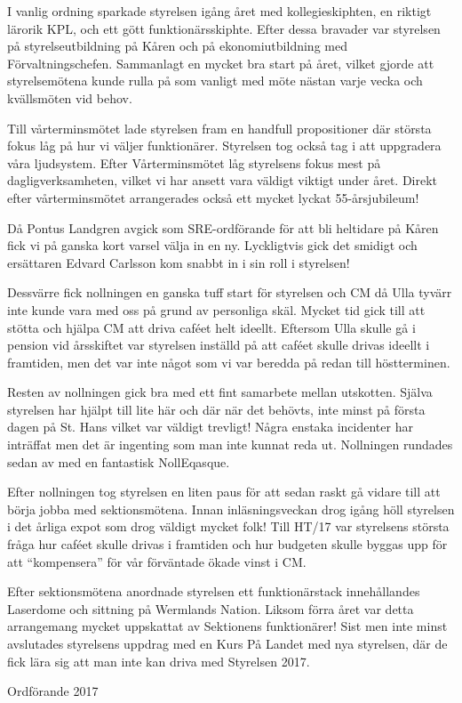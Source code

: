 \documentclass[../_main/handlingar.tex]{subfiles}
\begin{document}
I vanlig ordning sparkade styrelsen igång året med kollegieskiphten, en riktigt lärorik KPL, och ett gött funktionärsskiphte. Efter dessa bravader var styrelsen på styrelseutbildning på Kåren och på ekonomiutbildning med Förvaltningschefen. Sammanlagt en mycket bra start på året, vilket gjorde att styrelsemötena kunde rulla på som vanligt med möte nästan varje vecka och kvällsmöten vid behov.

Till vårterminsmötet lade styrelsen fram en handfull propositioner där största fokus låg på hur vi väljer funktionärer. Styrelsen tog också tag i att uppgradera våra ljudsystem. Efter Vårterminsmötet låg styrelsens fokus mest på dagligverksamheten, vilket vi har ansett vara väldigt viktigt under året. Direkt efter vårterminsmötet arrangerades också ett mycket lyckat 55-årsjubileum!

Då Pontus Landgren avgick som SRE-ordförande för att bli heltidare på Kåren fick vi på ganska kort varsel välja in en ny. Lyckligtvis gick det smidigt och ersättaren Edvard Carlsson kom snabbt in i sin roll i styrelsen!

Dessvärre fick nollningen en ganska tuff start för styrelsen och CM då Ulla tyvärr inte kunde vara med oss på grund av personliga skäl. Mycket tid gick till att stötta och hjälpa CM att driva caféet helt ideellt. Eftersom Ulla skulle gå i pension vid årsskiftet var styrelsen inställd på att caféet skulle drivas ideellt i framtiden, men det var inte något som vi var beredda på redan till höstterminen.

Resten av nollningen gick bra med ett fint samarbete mellan utskotten. Själva styrelsen har hjälpt till lite här och där när det behövts, inte minst på första dagen på St. Hans vilket var väldigt trevligt! Några enstaka incidenter har inträffat men det är ingenting som man inte kunnat reda ut. Nollningen rundades sedan av med en fantastisk NollEqasque.

Efter nollningen tog styrelsen en liten paus för att sedan raskt gå vidare till att börja jobba med sektionsmötena. Innan inläsningsveckan drog igång höll styrelsen i det årliga expot som drog väldigt mycket folk! Till HT/17 var styrelsens största fråga hur caféet skulle drivas i framtiden och hur budgeten skulle byggas upp för att ``kompensera'' för vår förväntade ökade vinst i CM.

Efter sektionsmötena anordnade styrelsen ett funktionärstack innehållandes Laserdome och sittning på Wermlands Nation. Liksom förra året var detta arrangemang mycket uppskattat av Sektionens funktionärer! Sist men inte minst avslutades styrelsens uppdrag med en Kurs På Landet med nya styrelsen, där de fick lära sig att man inte kan driva med Styrelsen 2017.

\begin{signatures}{1}
    \mvh
    \signature{Erik Månsson}{Ordförande 2017}
\end{signatures}
\end{document}
